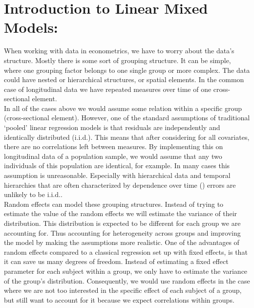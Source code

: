 \documentclass[a4paper,11pt]{article}
\begin{document}
 		
 		\section{Introduction to Linear Mixed Models:}
 			
 		
 		
 		
 		When working with data in econometrics, we have to worry about the data’s structure. Mostly there is some sort of grouping structure. It can be simple, where one grouping factor belongs to one single group or more complex. The data could have nested or hierarchical structures, or spatial elements.  In the common case of longitudinal data we have repeated measures over time of one cross-sectional element.\\ 
 		In all of the cases above we would assume some relation within a specific group (cross-sectional element). However, one of the standard assumptions of traditional ‘pooled’ linear regression models is that residuals are independently and identically distributed (i.i.d.). This means that after considering for all covariates, there are no correlations left between measures. By implementing this on longitudinal data of a population sample, we would assume that any two individuals of this population are identical, for example. In many cases this assumption is unreasonable. Especially with hierarchical data and temporal hierarchies that are often characterized by dependence over time (\cite{Bell}) errors are unlikely to be i.i.d..\\
 		Random effects can model these grouping structures. Instead of trying to estimate the value of the random effects we will estimate the variance of their distribution. This distribution is expected to be different for each group we are accounting for. Thus accounting for heterogeneity across groups and improving the model by making the assumptions more realistic. One of the advantages of random effects compared to a classical regression set up with fixed effects, is that it can save us many degrees of freedom. Instead of estimating a fixed effect parameter for each subject within a group, we only have to estimate the variance of the group’s distribution. Consequently, we would use random effects in the case where we are not too interested in the specific effect of each subject of a group, but still want to account for it because we expect correlations within groups.
 \\
\end{document}
